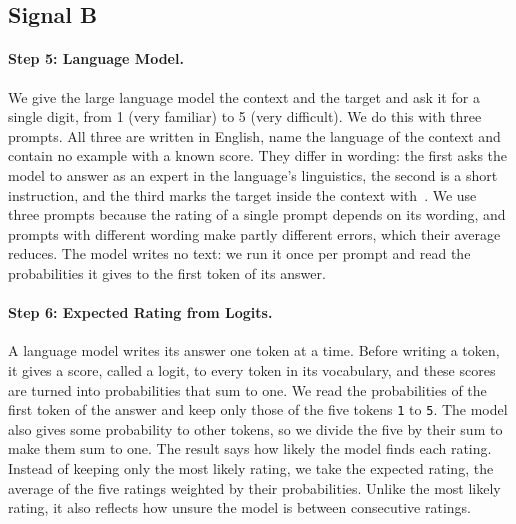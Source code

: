 \subsection{Signal B}
\label{sec:signal-b}

\paragraph{Step 5: Language Model.} We give the large language model the context and the target and %
ask it for a single digit, from 1 (very familiar) to 5 (very difficult). We do this with three
prompts. All three are written in English, name the language of the context and contain no example %
with a known score. They differ in wording: the first asks the model to answer as an expert in the
language's linguistics, the second is a short instruction, and the third marks the target inside %
the context with \guillemotleft\,\guillemotright. We use three prompts because the rating of a
single prompt depends on its wording, and prompts with different wording make partly different
errors, which their average reduces. The model writes no text: we run it once per prompt and read %
the probabilities it gives to the first token of its answer.

\paragraph{Step 6: Expected Rating from Logits.} A language model writes its answer one token at a
time. Before writing a token, it gives a score, called a logit, to every token in its vocabulary,
and these scores are turned into probabilities that sum to one. We read the probabilities of the
first token of the answer and keep only those of the five tokens \texttt{1} to \texttt{5}. The model %
also gives some probability to other tokens, so we divide the five by their sum to make them sum to
one. The result says how likely the model finds each rating. Instead of keeping only the most likely
rating, we take the expected rating, the average of the five ratings weighted by their
probabilities. Unlike the most likely rating, it also reflects how unsure the model is between
consecutive ratings.

